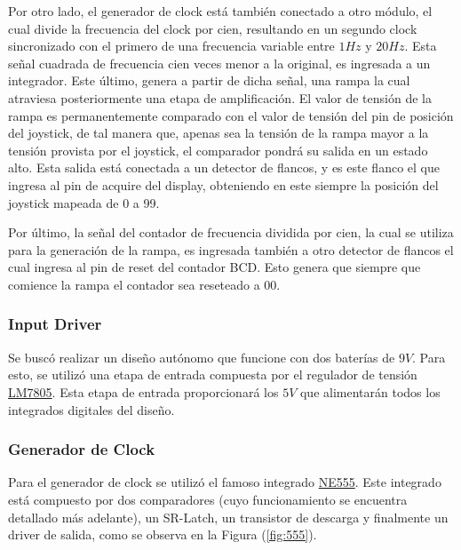 Por otro lado, el generador de clock está también conectado a otro módulo, el cual divide la frecuencia del clock por cien, resultando en un segundo clock sincronizado con el primero de una frecuencia variable entre $1Hz$ y $20Hz$. Esta señal cuadrada de frecuencia cien veces menor a la original, es ingresada a un integrador. Este último, genera a partir de dicha señal, una rampa la cual atraviesa posteriormente una etapa de amplificación. El valor de tensión de la rampa es permanentemente comparado con el valor de tensión del pin de posición del joystick, de tal manera que, apenas sea la tensión de la rampa mayor a la tensión provista por el joystick, el comparador pondrá su salida en un estado alto. Esta salida está conectada a un detector de flancos, y es este flanco el que ingresa al pin de acquire del display, obteniendo en este siempre la posición del joystick mapeada de 0 a 99.

Por último, la señal del contador de frecuencia dividida por cien, la cual se utiliza para la generación de la rampa, es ingresada también a otro detector de flancos el cual ingresa al pin de reset del contador BCD. Esto genera que siempre que comience la rampa el contador sea reseteado a 00.

\subsubsection{Input Driver}

Se buscó realizar un diseño autónomo que funcione con dos baterías de $9V$. Para esto, se utilizó una etapa de entrada compuesta por el regulador de tensión \href{https://www.sparkfun.com/datasheets/Components/LM7805.pdf}{LM7805}. Esta etapa de entrada proporcionará los $5V$ que alimentarán todos los integrados digitales del diseño.

\subsubsection{Generador de Clock}
\label{sec:clkgen}

Para el generador de clock se utilizó el famoso integrado \href{http://www.ti.com/lit/ds/symlink/se555.pdf}{NE555}. Este integrado está compuesto por dos comparadores (cuyo funcionamiento se encuentra detallado más adelante), un SR-Latch, un transistor de descarga y finalmente un driver de salida, como se observa en la Figura (\ref{fig:555}).

